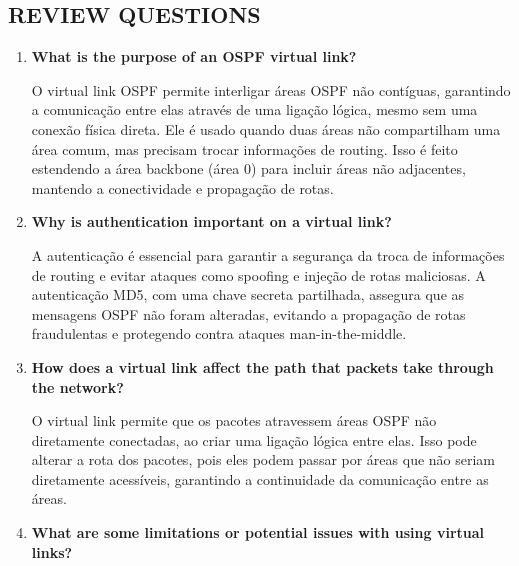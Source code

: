\documentclass[11pt,english, openright, oneside]{book}
\begin{document}
\newpage
\subsection{REVIEW QUESTIONS}
\vspace{0.2cm}

\begin{enumerate}
  \item \textbf{What is the purpose of an OSPF virtual link?}
  \vspace{0.2cm}

  \par O virtual link OSPF permite interligar áreas OSPF não contíguas, garantindo a comunicação entre elas através de uma ligação lógica, mesmo sem uma conexão física direta. Ele é usado quando duas áreas não compartilham uma área comum, mas precisam trocar informações de routing. Isso é feito estendendo a área backbone (área 0) para incluir áreas não adjacentes, mantendo a conectividade e propagação de rotas.
  \vspace{0.2cm}

  \item \textbf{Why is authentication important on a virtual link?}
  \vspace{0.2cm}

  \par A autenticação é essencial para garantir a segurança da troca de informações de routing e evitar ataques como spoofing e injeção de rotas maliciosas. A autenticação MD5, com uma chave secreta partilhada, assegura que as mensagens OSPF não foram alteradas, evitando a propagação de rotas fraudulentas e protegendo contra ataques man-in-the-middle.
  \vspace{0.2cm}

  \item \textbf{How does a virtual link affect the path that packets take through the network?}
  \vspace{0.2cm}

  \par O virtual link permite que os pacotes atravessem áreas OSPF não diretamente conectadas, ao criar uma ligação lógica entre elas. Isso pode alterar a rota dos pacotes, pois eles podem passar por áreas que não seriam diretamente acessíveis, garantindo a continuidade da comunicação entre as áreas.
  \vspace{0.2cm}

  \item \textbf{What are some limitations or potential issues with using virtual links?}
  \vspace{0.2cm}


\end{enumerate}
\end{document}
